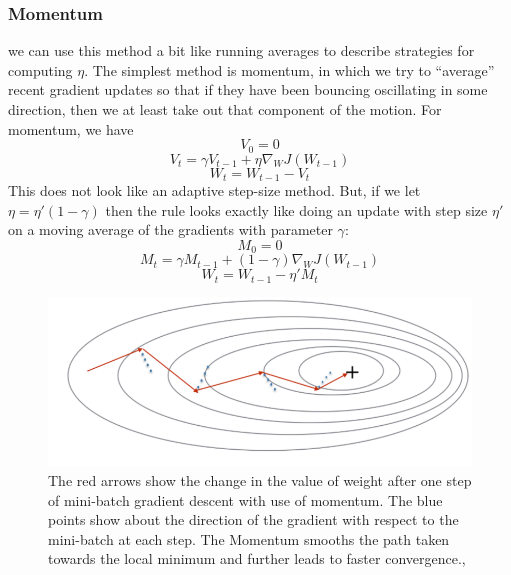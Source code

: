 \subsubsection{Momentum}
 we can use this method a bit like running averages to describe strategies for computing $\eta$. The simplest method is momentum, in which we try to “average” recent gradient updates so that if they have been bouncing oscillating in some direction, then we at least take out that component of the motion. For momentum, we have\\
\begin{equation*}
      V_0 = 0
\end{equation*}
\begin{equation*}
         V_t = \gamma V_{t-1} + \eta \nabla_W J (W_{t-1})
\end{equation*}
\begin{equation*}
         W_t =  W_{t-1} - V_t
\end{equation*}
This does not look like an adaptive step-size method. But, if we let
$\eta = \eta'(1-\gamma)$ then the rule looks exactly like doing an update with step size $\eta'$ on a moving average of the gradients with parameter $\gamma$:
\begin{equation*}
    M_0 = 0
\end{equation*}
\begin{equation*}
           M_t = \gamma M_{t-1} + (1-\gamma) \nabla_W J (W_{t-1})
\end{equation*}
\begin{equation*}
         W_t =  W_{t-1} - \eta'M_t
\end{equation*}

\begin{figure}[H]
    \centering
    \includegraphics[scale=0.3]{Figures/ml__11.png}
    \caption{The red arrows show the change in the value of weight after one step of mini-batch gradient descent with use of momentum. The blue points show about the direction of the gradient with respect to
the mini-batch at each step. The Momentum smooths the path taken towards the local
minimum and further leads to faster convergence.\cite{21},\cite{25}}
    \label{fig:my_label}
\end{figure}

